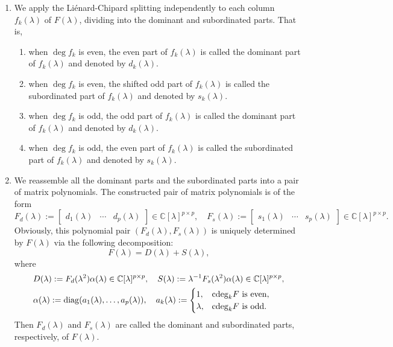 \documentclass[12pt,reqno]{amsart}
\theoremstyle{plain}
\numberwithin{equation}{section}
\theoremstyle{remark}
\begin{document}
\begin{enumerate}[label=\textbf{Step \arabic*}, start=1, align=left, leftmargin=*] %
\item \label{step1} We apply the Li\'{e}nard-Chipard splitting independently to each column $f_k(\lambda)$ of $F(\lambda)$, dividing into the dominant and subordinated parts. That is, 
\begin{enumerate}[label={(\roman*)}, align=left, leftmargin=*, nosep] %
    \item when $\deg f_k$ is even, the even part of $f_k(\lambda)$ is called the dominant part of $f_k(\lambda)$ and denoted by $d_k(\lambda)$.
    \item when $\deg f_k$ is even, the shifted odd part of $f_k(\lambda)$ is called the subordinated part of $f_k(\lambda)$ and denoted by $s_k(\lambda)$.
    \item when $\deg f_k$ is odd, the odd part of $f_k(\lambda)$ is called the dominant part of $f_k(\lambda)$ and denoted by $d_k(\lambda)$.
    \item when $\deg f_k$ is odd, the even part of $f_k(\lambda)$ is called the subordinated part of $f_k(\lambda)$ and denoted by $s_k(\lambda)$.
\end{enumerate}

\item \label{step2}  We reassemble all the dominant parts and the subordinated parts into a pair of 
matrix polynomials. The 
constructed pair of matrix polynomials is of the form
\begin{equation*}
F_d(\lambda):=\begin{bmatrix}
    d_1(\lambda)& \cdots& d_p(\lambda)
\end{bmatrix}\in \mathbb C[\lambda]^{p\times p},\quad F_s(\lambda):=\begin{bmatrix} s_1(\lambda)& \cdots& s_p(\lambda)\end{bmatrix}\in \mathbb C[\lambda]^{p\times p}.
\end{equation*}
Obviously, this polynomial pair $(F_d(\lambda), F_s(\lambda))$ is uniquely determined by $F(\lambda)$ via the following decomposition: 
\begin{equation*}
F(\lambda)=D(\lambda)+S(\lambda),
\end{equation*}
where
\begin{align}
& D(\lambda):=F_d(\lambda^2)\alpha(\lambda)\in \mathbb C[\lambda]^{p\times p},\quad S(\lambda):=\lambda^{-1} F_s(\lambda^2)\alpha(\lambda)\in \mathbb C[\lambda]^{p\times p}, \label{DS} \\
& \alpha(\lambda):={\rm diag}(a_1(\lambda),\ldots,a_p(\lambda)),
\quad  
a_k(\lambda):=\begin{cases}
1, & {\rm cdeg}_k F {\rm\ is\ even},\\
\lambda, & {\rm cdeg}_k F {\rm\ is\ odd}.
\end{cases} \label{alphaz}
\end{align}
Then $F_d(\lambda)$ and $F_s(\lambda)$ are called the dominant and subordinated parts, respectively, of $F(\lambda)$. 
\end{enumerate}
\end{document}
